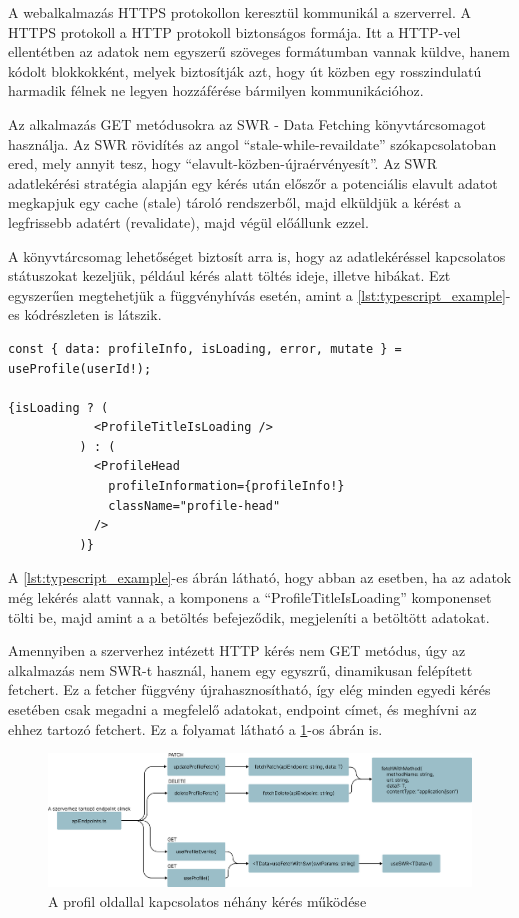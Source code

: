 A webalkalmazás HTTPS protokollon keresztül kommunikál a szerverrel. A HTTPS protokoll a HTTP protokoll biztonságos formája. Itt a HTTP-vel ellentétben az adatok nem egyszerű szöveges formátumban vannak küldve, hanem kódolt blokkokként, melyek biztosítják azt, hogy út közben egy rosszindulatú harmadik félnek ne legyen hozzáférése bármilyen kommunikációhoz.

Az alkalmazás GET metódusokra az SWR - Data Fetching\cite{swrdocs} könyvtárcsomagot használja. Az SWR rövidítés az angol ``stale-while-revaildate'' szókapcsolatoban ered, mely annyit tesz, hogy ``elavult-közben-újraérvényesít''. Az SWR adatlekérési stratégia alapján egy kérés után előszőr a potenciális elavult adatot megkapjuk egy cache (stale) tároló rendszerből, majd elküldjük a kérést a legfrissebb adatért (revalidate), majd végül előállunk ezzel.

A könyvtárcsomag lehetőséget biztosít arra is, hogy az adatlekéréssel kapcsolatos státuszokat kezeljük, például kérés alatt töltés ideje, illetve hibákat. Ezt egyszerűen megtehetjük a függvényhívás esetén, amint a \ref{lst:typescript_example}-es kódrészleten is látszik.

\newpage

\begin{lstlisting}[caption={SWR használata profil adatok lekérésére}, label={lst:typescript_example}]
const { data: profileInfo, isLoading, error, mutate } = useProfile(userId!);

{isLoading ? (
            <ProfileTitleIsLoading />
          ) : (
            <ProfileHead
              profileInformation={profileInfo!}
              className="profile-head"
            />
          )}
\end{lstlisting}

A \ref{lst:typescript_example}-es ábrán látható, hogy abban az esetben, ha az adatok még lekérés alatt vannak, a komponens a ``ProfileTitleIsLoading'' komponenset tölti be, majd amint a a betöltés befejeződik, megjeleníti a betöltött adatokat.

Amennyiben a szerverhez intézett HTTP kérés nem GET metódus, úgy az alkalmazás nem SWR-t használ, hanem egy egyszrű, dinamikusan felépített fetchert. Ez a fetcher függvény újrahasznosítható, így elég minden egyedi kérés esetében csak megadni a megfelelő adatokat, endpoint címet, és meghívni az ehhez tartozó fetchert. Ez a folyamat látható a \ref{fig:fetching_data_example}-os ábrán is.

\begin{figure}[h]
    \centering
    \includegraphics[width=\textwidth]{./images/fetchingData.png}
    \caption{A profil oldallal kapcsolatos néhány kérés működése}
    \label{fig:fetching_data_example}
\end{figure}

